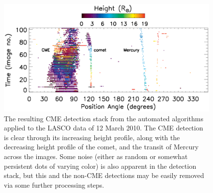 \documentclass[preprint2]{aastex}
\begin{document}
\begin{figure}[!t]
\centerline{\includegraphics[scale=0.57, width=\linewidth]{figure_20100312_stack.eps}}
\caption{The resulting CME detection stack from the automated algorithms applied to the LASCO data of 12 March 2010. The CME detection is clear through its increasing height profile, along with the decreasing height profile of the comet, and the transit of Mercury across the images. Some noise (either as random or somewhat persistent dots of varying color) is also apparent in the detection stack, but this and the non-CME detections may be easily removed via some further processing steps.}
\label{figure_20100312_stack}
\end{figure}
\end{document}
